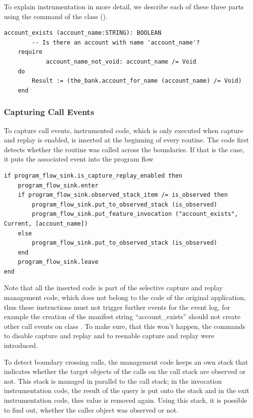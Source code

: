 To explain instrumentation in more detail, we describe each of these three parts using the command  of the class  ().

\begin{lstlisting}[caption=Original Code of Command \feature{account\_exists} ,label=lst:account_exists_original]
account_exists (account_name:STRING): BOOLEAN
		-- Is there an account with name 'account_name'?
	require
			account_name_not_void: account_name /= Void
	do
		Result := (the_bank.account_for_name (account_name) /= Void)
	end
\end{lstlisting}

\subsubsection{Capturing Call Events}
To capture call events, instrumented code, which is only executed when capture and replay is enabled, is inserted at the beginning of every routine. The code first detects whether the routine was called across the boundaries. If that is the case, it puts the associated event into the program flow 
\begin{lstlisting}[caption=Instrumentation Code to Detect Call Events,label=lst:invocation_instrumentation]
if program_flow_sink.is_capture_replay_enabled then
	program_flow_sink.enter
	if program_flow_sink.observed_stack_item /= is_observed then
		program_flow_sink.put_to_observed_stack (is_observed)
		program_flow_sink.put_feature_invocation ("account_exists", Current, [account_name])
	else
		program_flow_sink.put_to_observed_stack (is_observed)
	end
	program_flow_sink.leave
end
\end{lstlisting}
Note that all the inserted code is part of the selective capture and replay management code, which does not belong to the code of the original application, thus these instructions must not trigger further events for the event log, for example the creation of the manifest string ``account\_exists'' should not create other call events on class . To make sure, that this won't happen, the commands  to disable capture and replay and  to reenable capture and replay were introduced.

To detect boundary crossing calls, the management code keeps an own stack that indicates whether the target objects of the calls on the call stack are observed or not. This stack is managed in parallel to the call stack; in the invocation instrumentation code, the result of the query  is put onto the stack and in the exit instrumentation code, thes value is removed again. Using this stack, it is possible to find out, whether the caller object was observed or not.


